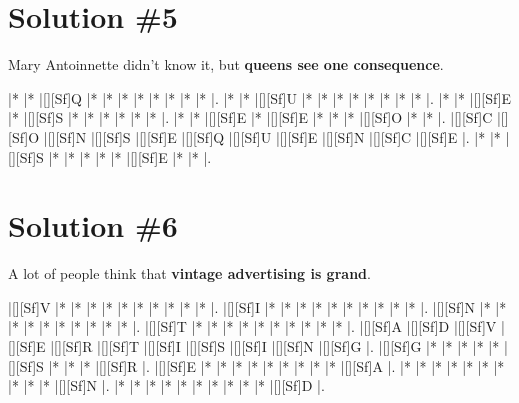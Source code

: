 \documentclass[letterpaper]{article}
\begin{document}
\newpage
\section*{Solution \#5}
Mary Antoinnette didn't know it, but \textbf{queens see one consequence}.

\vspace*{1em}
\begin{Puzzle}{11}{6}
|*        |*        |[][Sf]Q  |*        |*        |*        |*        |*        |*        |*        |*        |. 
|*        |*        |[][Sf]U  |*        |*        |*        |*        |*        |*        |*        |*        |.  
|*        |*        |[][Sf]E  |*        |[][Sf]S  |*        |*        |*        |*        |*        |*        |.
|*        |*        |[][Sf]E  |*        |[][Sf]E  |*        |*        |*        |[][Sf]O  |*        |*        |.  
|[][Sf]C  |[][Sf]O  |[][Sf]N  |[][Sf]S  |[][Sf]E  |[][Sf]Q  |[][Sf]U  |[][Sf]E  |[][Sf]N  |[][Sf]C  |[][Sf]E  |.
|*        |*        |[][Sf]S  |*        |*        |*        |*        |*        |[][Sf]E  |*        |*        |.
\end{Puzzle}

\newpage
\section*{Solution \#6}
A lot of people think that \textbf{vintage advertising is grand}.

\vspace*{1em}
\begin{Puzzle}{11}{9}
|[][Sf]V  |*        |*        |*        |*        |*        |*        |*        |*        |*        |*        |. 
|[][Sf]I  |*        |*        |*        |*        |*        |*        |*        |*        |*        |*        |.  
|[][Sf]N  |*        |*        |*        |*        |*        |*        |*        |*        |*        |*        |.
|[][Sf]T  |*        |*        |*        |*        |*        |*        |*        |*        |*        |*        |.  
|[][Sf]A  |[][Sf]D  |[][Sf]V  |[][Sf]E  |[][Sf]R  |[][Sf]T  |[][Sf]I  |[][Sf]S  |[][Sf]I  |[][Sf]N  |[][Sf]G  |.
|[][Sf]G  |*        |*        |*        |*        |*        |[][Sf]S  |*        |*        |*        |[][Sf]R  |. 
|[][Sf]E  |*        |*        |*        |*        |*        |*        |*        |*        |*        |[][Sf]A  |.
|*        |*        |*        |*        |*        |*        |*        |*        |*        |*        |[][Sf]N  |.
|*        |*        |*        |*        |*        |*        |*        |*        |*        |*        |[][Sf]D  |.
\end{Puzzle}
\end{document}
